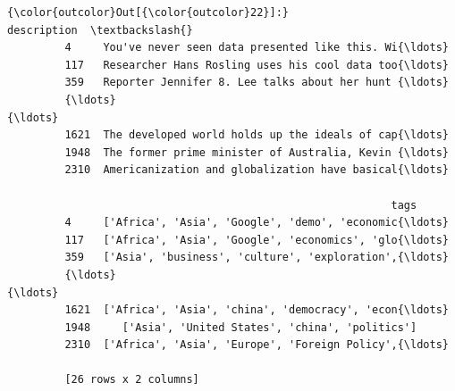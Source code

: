 \documentclass[11pt]{ctexart}
\begin{document}
\begin{Verbatim}[commandchars=\\\{\}]
{\color{outcolor}Out[{\color{outcolor}22}]:}                                             description  \textbackslash{}
         4     You've never seen data presented like this. Wi{\ldots}   
         117   Researcher Hans Rosling uses his cool data too{\ldots}   
         359   Reporter Jennifer 8. Lee talks about her hunt {\ldots}   
         {\ldots}                                                 {\ldots}   
         1621  The developed world holds up the ideals of cap{\ldots}   
         1948  The former prime minister of Australia, Kevin {\ldots}   
         2310  Americanization and globalization have basical{\ldots}   
         
                                                            tags  
         4     ['Africa', 'Asia', 'Google', 'demo', 'economic{\ldots}  
         117   ['Africa', 'Asia', 'Google', 'economics', 'glo{\ldots}  
         359   ['Asia', 'business', 'culture', 'exploration',{\ldots}  
         {\ldots}                                                 {\ldots}  
         1621  ['Africa', 'Asia', 'china', 'democracy', 'econ{\ldots}  
         1948     ['Asia', 'United States', 'china', 'politics']  
         2310  ['Africa', 'Asia', 'Europe', 'Foreign Policy',{\ldots}  
         
         [26 rows x 2 columns]
\end{Verbatim}
            

    
    
    
    
\end{document}
